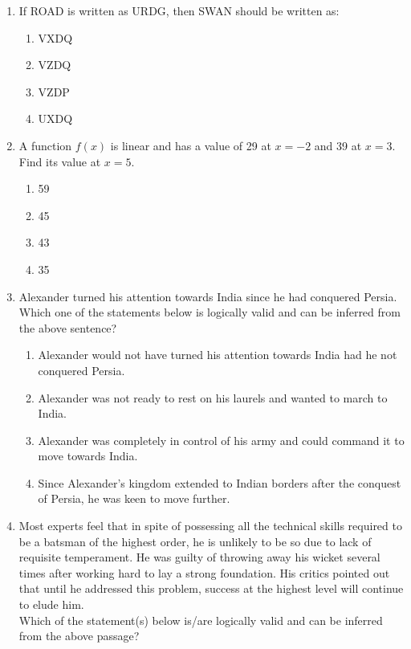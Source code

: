 \documentclass[journal]{IEEEtran}
\begin{document}
\begin{enumerate}
    \item If ROAD is written as URDG, then SWAN should be written as:
    \begin{enumerate}
        \item VXDQ
        \item VZDQ
        \item VZDP
        \item UXDQ
    \end{enumerate}
    \item A function $f(x)$ is linear and has a value of 29 at $x = -2$ and 39 at $x = 3$. Find its value at $x = 5$.
     \begin{multicols}{4}
    \begin{enumerate}
        \item 59
        \item 45
        \item 43
        \item 35
    \end{enumerate}
      \end{multicols}
    \item Alexander turned his attention towards India since he had conquered Persia. Which one of the statements below is logically valid and can be inferred from the above sentence?
    \begin{enumerate}
        \item Alexander would not have turned his attention towards India had he not conquered Persia.
        \item Alexander was not ready to rest on his laurels and wanted to march to India.
        \item Alexander was completely in control of his army and could command it to move towards India.
        \item Since Alexander’s kingdom extended to Indian borders after the conquest of Persia, he was keen to move further.
    \end{enumerate}
\item Most experts feel that in spite of possessing all the technical skills required to be a batsman of the highest order, he is unlikely to be so due to lack of requisite temperament. He was guilty of throwing away his wicket several times after working hard to lay a strong foundation. His critics pointed out that until he addressed this problem, success at the highest level will continue to elude him.\\
Which of the statement(s) below is/are logically valid and can be inferred from the above passage?

\end{enumerate}
\end{document}
